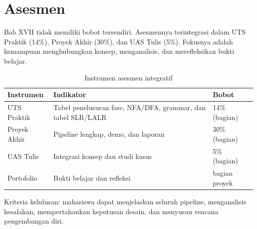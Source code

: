 \section*{Asesmen}

Bab XVII tidak memiliki bobot tersendiri. Asesmennya terintegrasi
dalam UTS Praktik (14\%), Proyek Akhir (30\%), dan UAS Tulis (5\%).
Fokusnya adalah kemampuan menghubungkan konsep, menganalisis, dan
merefleksikan bukti belajar.

\begin{table}[H]
\centering
\caption{Instrumen asesmen integratif}
\label{tab:ch17-asesmen}
\begin{tabularx}{\textwidth}{@{}lXl@{}}
\toprule
\textbf{Instrumen} & \textbf{Indikator} & \textbf{Bobot} \\
\midrule
UTS Praktik & Tabel penelusuran fase, NFA/DFA, grammar, dan tabel
SLR/LALR & 14\% (bagian) \\
Proyek Akhir & Pipeline lengkap, demo, dan laporan & 30\% (bagian) \\
UAS Tulis & Integrasi konsep dan studi kasus & 5\% (bagian) \\
Portofolio & Bukti belajar dan refleksi & bagian proyek \\
\bottomrule
\end{tabularx}
\end{table}

Kriteria kelulusan: mahasiswa dapat menjelaskan seluruh pipeline,
menganalisis kesalahan, mempertahankan keputusan desain, dan menyusun
rencana pengembangan diri.

